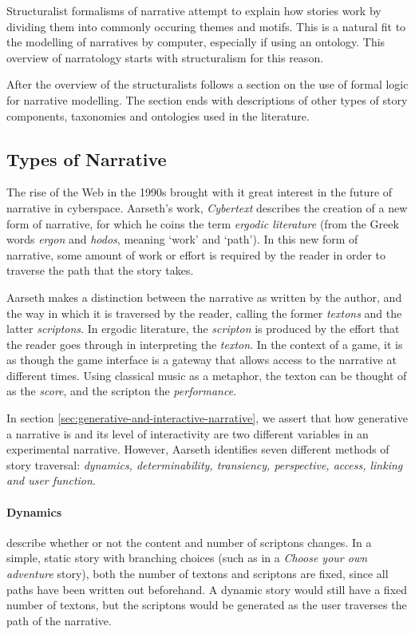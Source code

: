 Structuralist formalisms of narrative attempt to explain how stories work by dividing them into commonly occuring themes and motifs. This is a natural fit to the modelling of narratives by computer, especially if using an ontology. This overview of narratology starts with structuralism for this reason.

After the overview of the structuralists follows a section on the use of formal logic for narrative modelling. The section ends with descriptions of other types of story components, taxonomies and ontologies used in the literature.

\subsection{Types of Narrative}
The rise of the Web in the 1990s brought with it great interest in the future of narrative in cyberspace. Aarseth's work, \emph{Cybertext} \citep{aarseth1997cybertext} describes the creation of a new form of narrative, for which he coins the term \emph{ergodic literature} (from the Greek words \emph{ergon} and \emph{hodos}, meaning `work' and `path'). In this new form of narrative, some amount of work or effort is required by the reader in order to traverse the path that the story takes.

Aarseth makes a distinction between the narrative as written by the author, and the way in which it is traversed by the reader, calling the former \emph{textons} and the latter \emph{scriptons}. In ergodic literature, the \emph{scripton} is produced by the effort that the reader goes through in interpreting the \emph{texton}. In the context of a game, it is as though the game interface is a gateway that allows access to the narrative at different times. Using classical music as a metaphor, the texton can be thought of as the \emph{score}, and the scripton the \emph{performance}.

In section \ref{sec:generative-and-interactive-narrative}, we assert that how generative a narrative is and its level of interactivity are two different variables in an experimental narrative. However, Aarseth identifies seven different methods of story traversal: \emph{dynamics, determinability, transiency, perspective, access, linking and user function}.

\paragraph{Dynamics} describe whether or not the content and number of scriptons changes. In a simple, static story with branching choices (such as in a \emph{Choose your own adventure} story), both the number of textons and scriptons are fixed, since all paths have been written out beforehand. A dynamic story would still have a fixed number of textons, but the scriptons would be generated as the user traverses the path of the narrative.

